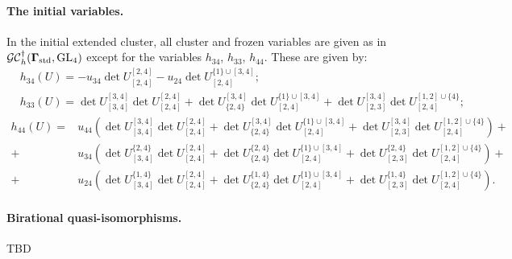  \paragraph{The initial variables.} In the initial extended cluster, all cluster and frozen variables are given as in $\mathcal{GC}_h^{\dagger}(\mathbf{\Gamma}_{\text{std}},\operatorname{GL}_4)$ except for the variables $h_{34}$, $h_{33}$, $h_{44}$. These are given by:
\begin{align}
    &h_{34}(U) = -u_{34}\det U^{[2,4]}_{[2,4]} - u_{24} \det U^{\{1\}\cup[3,4]}_{[2,4]};\\
    &h_{33}(U) = \det U^{[3,4]}_{[3,4]} \det U^{[2,4]}_{[2,4]} + \det U^{[3,4]}_{\{2,4\}} \det U^{\{1\}\cup[3,4]}_{[2,4]} + \det U^{[3,4]}_{[2,3]}\det U^{[1,2]\cup\{4\}}_{[2,4]};
\end{align}
\begin{equation}
    \begin{split}
     h_{44}(U) = &u_{44}\left(\det U^{[3,4]}_{[3,4]} \det U^{[2,4]}_{[2,4]} + \det U^{[3,4]}_{\{2,4\}} \det U^{\{1\}\cup[3,4]}_{[2,4]} + \det U^{[3,4]}_{[2,3]}\det U^{[1,2]\cup\{4\}}_{[2,4]}\right) + \\ + &u_{34}\left(\det U^{\{2,4\}}_{[3,4]} \det U^{[2,4]}_{[2,4]} + \det U^{\{2,4\}}_{\{2,4\}} \det U^{\{1\}\cup[3,4]}_{[2,4]} + \det U^{\{2,4\}}_{[2,3]}\det U^{[1,2]\cup\{4\}}_{[2,4]}\right) + \\ + &u_{24}\left(\det U^{\{1,4\}}_{[3,4]} \det U^{[2,4]}_{[2,4]} + \det U^{\{1,4\}}_{\{2,4\}} \det U^{\{1\}\cup[3,4]}_{[2,4]} + \det U^{\{1,4\}}_{[2,3]}\det U^{[1,2]\cup\{4\}}_{[2,4]}\right).
    \end{split}
\end{equation}

\paragraph{Birational quasi-isomorphisms.} TBD